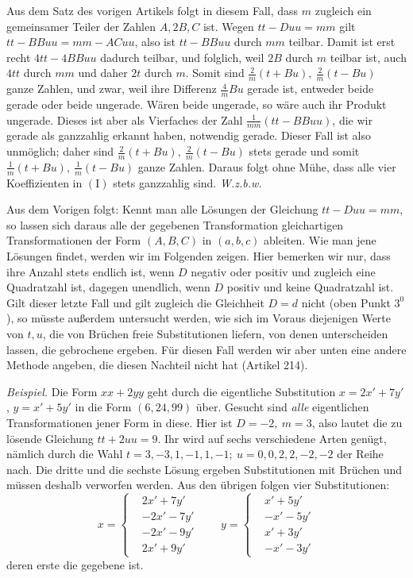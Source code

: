 Aus dem Satz des vorigen Artikels folgt in diesem Fall, dass $m$ zugleich ein gemeinsamer Teiler der Zahlen $A,2B,C$ ist. Wegen $tt-Duu=mm$ gilt $tt-BBuu=mm-ACuu$, also ist $tt-BBuu$ durch $mm$ teilbar. Damit ist erst recht $4tt-4BBuu$ dadurch teilbar, und folglich, weil $2B$ durch $m$ teilbar ist, auch $4tt$ durch $mm$ und daher $2t$ durch $m$. Somit sind $\frac{2}{m}(t+Bu),\ \frac{2}{m}(t-Bu)$ ganze Zahlen, und zwar, weil ihre Differenz $\frac{4}{m}Bu$ gerade ist, entweder beide gerade oder beide ungerade. Wären beide ungerade, so wäre auch ihr Produkt ungerade. Dieses ist aber als Vierfaches der Zahl $\frac{1}{mm}(tt-BBuu)$, die wir gerade als ganzzahlig erkannt haben, notwendig gerade. Dieser Fall ist also unmöglich; daher sind $\frac{2}{m}(t+Bu),\ \frac{2}{m}(t-Bu)$ stets gerade und somit $\frac{1}{m}(t+Bu),\ \frac{1}{m}(t-Bu)$ ganze Zahlen. Daraus folgt ohne Mühe, dass alle vier Koeffizienten in $(\mathrm{I})$ stets ganzzahlig sind. \mbox{\textit{W.z.b.w.}}

Aus dem Vorigen folgt: Kennt man alle Lösungen der Gleichung $tt-Duu=mm$, so lassen sich daraus alle der gegebenen Transformation gleichartigen Transformationen der Form $(A,B,C)$ in $(a,b,c)$ ableiten. Wie man jene Lösungen findet, werden wir im Folgenden zeigen. Hier bemerken wir nur, dass ihre Anzahl stets endlich ist, wenn $D$ negativ oder positiv und zugleich eine Quadratzahl ist, dagegen unendlich, wenn $D$ positiv und keine Quadratzahl ist. Gilt dieser letzte Fall und gilt zugleich die Gleichheit $D$$=d$ nicht (oben Punkt $3^0$), so müsste außerdem untersucht werden, wie sich im Voraus diejenigen Werte von $t,u$, die von Brüchen freie Substitutionen liefern, von denen unterscheiden lassen, die gebrochene ergeben. Für diesen Fall werden wir aber unten eine andere Methode angeben, die diesen Nachteil nicht hat (Artikel 214).

\textit{Beispiel.} Die Form $xx+2yy$ geht durch die eigentliche Substitution $x=2x'+7y'$, $y=x'+5y'$ in die Form $(6,24,99)$ über. Gesucht sind \textit{alle} eigentlichen Transformationen jener Form in diese. Hier ist $D=-2,\ m=3$, also lautet die zu lösende Gleichung $tt+2uu=9$. Ihr wird auf sechs verschiedene Arten genügt, nämlich durch die Wahl $t=3,-3,1,-1,1,-1;\ u=0,0,2,2,-2,-2$ der Reihe nach. Die dritte und die sechste Lösung ergeben Substitutionen mit Brüchen und müssen deshalb verworfen werden. Aus den übrigen folgen vier Substitutionen:
\[
x=\left\{\begin{aligned}
&2x'+7y'\\
&-2x'-7y'\\
&-2x'-9y'\\
&2x'+9y'
\end{aligned}\right.
\qquad
y=\left\{\begin{aligned}
&x'+5y'\\
&-x'-5y'\\
&x'+3y'\\
&-x'-3y'
\end{aligned}\right.
\]
deren erste die gegebene ist.
